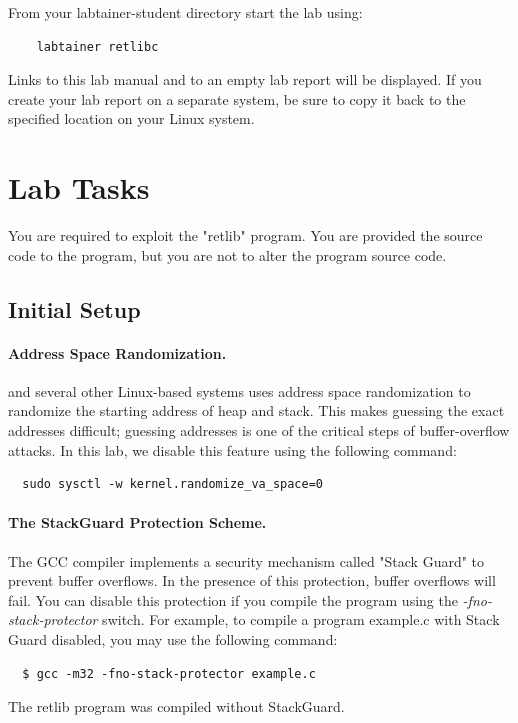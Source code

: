 From your labtainer-student directory start the lab using:
\begin{verbatim}
    labtainer retlibc
\end{verbatim}
Links to this lab manual and to an empty lab report will be displayed.  If you create your lab report on a separate system,
be sure to copy it back to the specified location on your Linux system.


\section{Lab Tasks}
You are required to exploit the "retlib" program.  You are provided the
source code to the program, but you are not to alter the program source code.

\subsection{Initial Setup}

\paragraph{Address Space Randomization.}
\ubuntu and several other Linux-based systems uses address space
randomization to randomize the starting address of heap and
stack. This makes guessing the exact addresses difficult; guessing
addresses is one of the critical steps of buffer-overflow attacks.  In
this lab, we disable this feature using the following command:

\begin{verbatim}
  sudo sysctl -w kernel.randomize_va_space=0
\end{verbatim}


\paragraph{The StackGuard Protection Scheme.}
The GCC compiler implements a security mechanism called
"Stack Guard" to prevent buffer overflows. In the presence of this
protection, buffer overflows will fail. You can disable this
protection if you compile the program using the
\emph{-fno-stack-protector} switch. For example, to compile a program
example.c with Stack Guard disabled, you may use the following command:
\begin{verbatim}
  $ gcc -m32 -fno-stack-protector example.c
\end{verbatim}

The retlib program was compiled without StackGuard.

